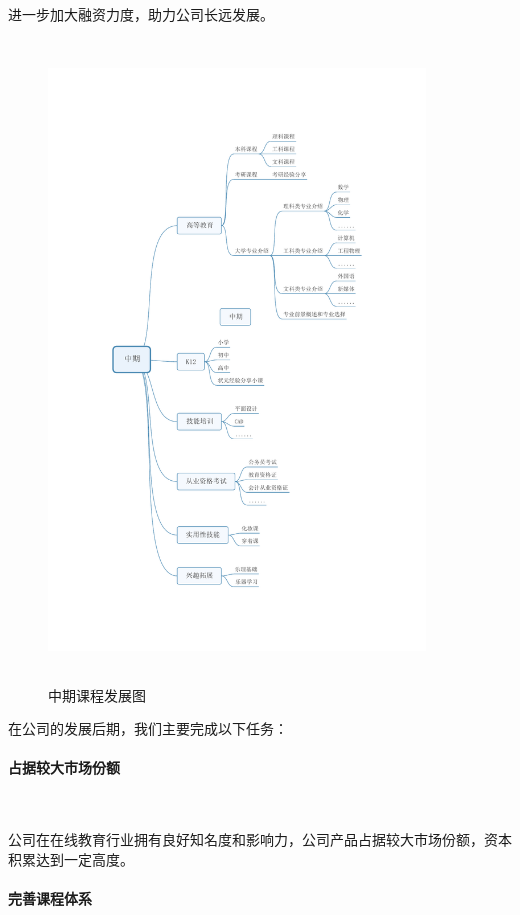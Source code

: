 进一步加大融资力度，助力公司长远发展。
\newpage
\begin{figure}[H]
	\centering
	\includegraphics[width=10cm,height=17cm]{figures/mid_development}%
	\caption{中期课程发展图}
	\label{fg:mid_development}
\end{figure}

在公司的发展后期，我们主要完成以下任务：

\paragraph{占据较大市场份额}\

公司在在线教育行业拥有良好知名度和影响力，公司产品占据较大市场份额，资本积累达到一定高度。

\paragraph{完善课程体系}\

